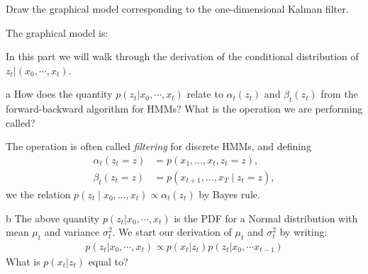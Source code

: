 \documentclass[expanded]{lkx_pset}
\begin{document}
\begin{parts}
	\begin{part}{1} Draw the graphical model corresponding to the one-dimensional Kalman filter.
	\end{part}

	The graphical model is:

	\begin{center}
	\end{center}

	\begin{part}{2} In this part we will walk through the derivation of the conditional distribution of $z_t|(x_0, \cdots, x_{t})$.
	\end{part}
	\begin{parts}
		\begin{part}{a} How does the quantity $p(z_t| x_0, \cdots, x_{t})$ relate to $\alpha_t(z_t)$ and $\beta_t(z_t)$ from the forward-backward algorithm for HMMs?  What is the operation we are performing called?
		\end{part}

		The operation is often called \emph{filtering} for discrete HMMs, and defining
		\[
			\begin{aligned}
				\alpha_t(z_t = z) & = p(x_1,\ldots, x_t, z_t = z),         \\
				\beta_t(z_t = z)  & = p(x_{t+1},\ldots, x_T \mid z_t = z),
			\end{aligned}
		\]
		we the relation $p(z_t\mid x_0, \ldots, x_t) \propto \alpha_t(z_t)$ by Bayes rule.

		\begin{part}{b} The above quantity $p(z_t|x_0, \cdots, x_t)$ is the PDF for a Normal distribution with mean $\mu_t$ and variance $\sigma_t^2$. We start our derivation of $\mu_t$ and $\sigma_t^2$ by writing:
			\begin{align*}
				p(z_t|x_0, \cdots, x_t) \propto p(x_t|z_t)p(z_t|x_0, \cdots x_{t-1})
			\end{align*}
			What is $p(x_t|z_t)$ equal to?
		\end{part}


\end{parts}
\end{parts}
\end{document}
